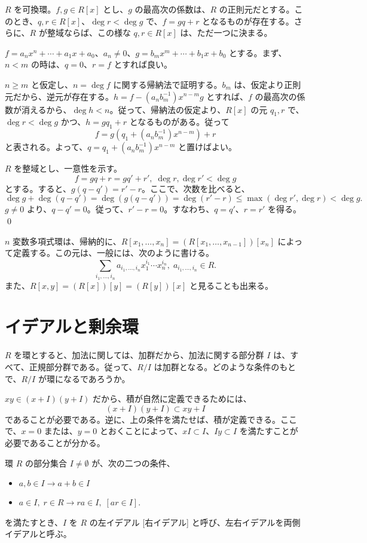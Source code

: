 \begin{thm} \label{thm:poly-euclid}
$R$ を可換環。$f, g\in R[x]$ とし、$g$ の最高次の係数は、$R$ の正則元だとする。このとき、$q, r\in R[x]$、$\deg r < \deg g$ で、$f = gq + r$ となるものが存在する。さらに、$R$ が整域ならば、この様な $q, r\in R[x]$ は、ただ一つに決まる。
\end{thm}
\proof
$f = a_nx^n + \cdots + a_1x + a_0$、$a_n\neq 0$、$g = b_mx^m + \cdots + b_1x + b_0$ とする。まず、$n<m$ の時は、$q = 0$、$r = f$ とすれば良い。

$n\geq m$ と仮定し、$n = \deg f$ に関する帰納法で証明する。$b_m$ は、仮定より正則元だから、逆元が存在する。$h = f - (a_nb_m^{-1})x^{n-m}g$ とすれば、$f$ の最高次の係数が消えるから、$\deg h < n$。従って、帰納法の仮定より、$R[x]$ の元 $q_1, r$ で、$\deg r < \deg g$ かつ、$h = gq_1 + r$ となるものがある。従って
$$f = g(q_1 + (a_nb_m^{-1})x^{n-m}) + r$$
と表される。よって、$q = q_1 + (a_nb_m^{-1})x^{n-m}$  と置けばよい。

$R$ を整域とし、一意性を示す。
$$f = gq + r = gq' + r', \; \deg r, \deg r' < \deg g$$
とする。すると、$g(q - q') = r' - r$。ここで、次数を比べると、
$$\deg g + \deg(q - q') = \deg(g(q-q')) = \deg(r' -r) \leq \max(\deg r', \deg r) < \deg g.$$
$g\neq 0$ より、$q - q' = 0$。従って、$r' - r = 0$。すなわち、$q = q'$、$r = r'$ を得る。
\qed

\medskip
$n$ 変数多項式環は、帰納的に、$R[x_1,\ldots, x_n] = (R[x_1,\ldots, x_{n-1}])[x_n]$ によって定義する。この元は、一般には、次のように書ける。
$$\sum_{i_1, \ldots, i_n}a_{i_1,\ldots, i_n}x_1^{i_1}\cdots x_n^{i_n}, \; a_{i_1,\ldots, i_n}\in R.$$
また、$R[x,y] = (R[x])[y] = (R[y])[x]$ と見ることも出来る。

\newpage
\section{イデアルと剰余環}
$R$ を環とすると、加法に関しては、加群だから、加法に関する部分群 $I$ は、すべて、正規部分群である。従って、$R/I$ は加群となる。どのような条件のもとで、$R/I$ が環になるであろうか。

$xy \in (x+I)(y+I)$ だから、積が自然に定義できるためには、
$$(x+I)(y+I) \subset xy + I$$
であることが必要である。逆に、上の条件を満たせば、積が定義できる。ここで、$x = 0$ または、$y = 0$ とおくことによって、$xI\subset I$、$Iy\subset I$ を満たすことが必要であることが分かる。

\begin{definition}
環 $R$ の部分集合 $I\neq \emptyset$ が、次の二つの条件、
\begin{itemize}
\item $a, b\in I\longrightarrow a+b\in I$
\item $a\in I, \;r\in R \longrightarrow ra\in I,\;[ar\in I]$.
\end{itemize}
を満たすとき、$I$ を $R$ の左イデアル [右イデアル] と呼び、左右イデアルを両側イデアルと呼ぶ。
\end{definition}

